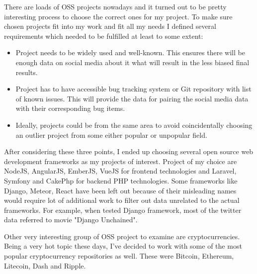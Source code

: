 There are loads of OSS projects nowadays and it turned out to be pretty interesting process to choose the correct ones for my project. To make sure chosen projects fit into my work and fit  all my needs I defined several requirements which needed to be fulfilled at least to some extent:

\begin{itemize}
  \item Project needs to be widely used and well-known. This ensures there will be enough data on social media about it what will result in the less biased final results.
  \item Project has to have accessible bug tracking system or Git repository with list of known issues. This will provide the data for pairing the social media data with their corresponding bug items.
  \item Ideally, projects could be from the same area to avoid coincidentally choosing an outlier project from some either popular or unpopular field.
\end{itemize}

After considering these three points, I ended up choosing several open source web development frameworks as my projects of interest. Project of my choice are NodeJS, AngularJS, EmberJS, VueJS for frontend technologies and Laravel, Symfony and CakePhp for backend PHP technologies. Some frameworks like Django, Meteor, React have been left out because of their misleading names  would require lot of additional work to filter out data unrelated to the actual frameworks. For example, when tested Django framework, most of the twitter data referred to movie "Django Unchained".

Other very interesting group of OSS project to examine are cryptocurrencies. Being a very hot topic these days, I've decided to work with some of the most popular cryptocurrency repositories as well. These were Bitcoin, Ethereum, Litecoin, Dash and Ripple.